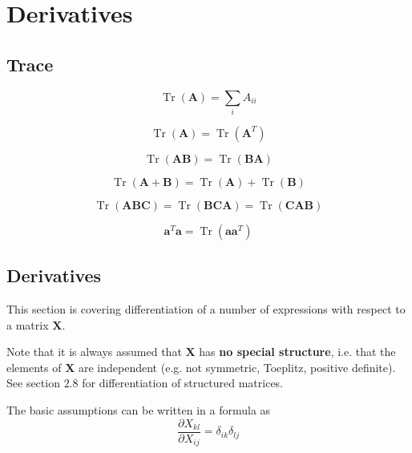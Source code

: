 \chapter{Derivatives}

\section{Trace}

\begin{equation} \operatorname{Tr}(\mathbf{A})=\sum_{i} A_{i i} \end{equation}

\begin{equation} \operatorname{Tr}(\mathbf{A})=\operatorname{Tr}\left(\mathbf{A}^{T}\right) \end{equation}

\begin{equation} \operatorname{Tr}(\mathbf{A B})=\operatorname{Tr}(\mathbf{B A}) \end{equation}

\begin{equation} \operatorname{Tr}(\mathbf{A}+\mathbf{B})=\operatorname{Tr}(\mathbf{A})+\operatorname{Tr}(\mathbf{B}) \end{equation}

\begin{equation} \operatorname{Tr}(\mathbf{A B C})=\operatorname{Tr}(\mathbf{B C A})=\operatorname{Tr}(\mathbf{C A B}) \end{equation}

\begin{equation} \mathbf{a}^{T} \mathbf{a}=\operatorname{Tr}\left(\mathbf{a a}^{T}\right) \end{equation}

\section{Derivatives}

This section is covering differentiation of a number of expressions with respect to a matrix $ \mathbf{X} $. 

Note that it is always assumed that $ \mathbf{X} $ has \textbf{no special structure}, i.e. that the elements of $ \mathbf{X} $ are independent (e.g. not symmetric, Toeplitz, positive definite). See section $ 2.8 $ for differentiation of structured matrices. 

\begin{theorem}
    The basic assumptions can be written in a formula as
\begin{equation}
\frac{\partial X_{k l}}{\partial X_{i j}}=\delta_{i k} \delta_{l j}
\end{equation}
\end{theorem}


